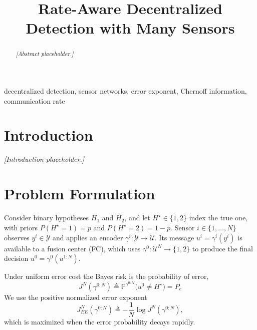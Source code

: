 \documentclass[conference]{IEEEtran}
\title{Rate-Aware Decentralized Detection with Many Sensors}
\author{%
\IEEEauthorblockN{Oren Ram and Ziv Abraham}}
\begin{document}
\maketitle

\begin{abstract}
\textit{[Abstract placeholder.]}
\end{abstract}

\begin{IEEEkeywords}
decentralized detection, sensor networks, error exponent, Chernoff information, communication rate
\end{IEEEkeywords}

\section{Introduction}
\textit{[Introduction placeholder.]}

\section{Problem Formulation}
Consider binary hypotheses $H_1$ and $H_2$, and let
$H^\star\in\{1,2\}$ index the true one, with priors $P(H^\star=1)=p$ and
$P(H^\star=2)=1-p$.  Sensor $i\in\{1,\ldots,N\}$
observes $y^i\in\mathcal{Y}$ and applies an encoder
$\gamma^i:\mathcal{Y}\to\mathcal{U}$.  Its message
$u^i=\gamma^i(y^i)$ is available to a fusion center (FC), which uses
$\gamma^0:\mathcal{U}^N\to\{1,2\}$ to produce the final decision
$u^0=\gamma^0(u^{1:N})$.

Under uniform error cost the Bayes risk is the probability of error,
\begin{equation}
 J^N(\gamma^{0:N}) \triangleq
 \mathbb{P}^{\gamma^{0:N}}\big(u^0\neq H^\star\big) = P_e
 \label{eq:bayes-risk}
\end{equation}
We use the positive normalized error exponent
\begin{equation}
 J^N_{EE}(\gamma^{0:N}) \triangleq -\frac{1}{N}\log J^N(\gamma^{0:N}),
 \label{eq:error-exponent}
\end{equation}
which is maximized when the error probability decays rapidly.
\end{document}
